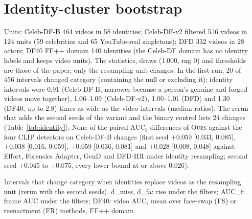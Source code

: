 \documentclass[10pt]{article}
\newcommand{\ours}{\textsc{Ours}}
\begin{document}
\section{Identity-cluster bootstrap}
\label{sec:identity}
Units: Celeb-DF-B 464 videos in 58 identities; Celeb-DF-v2 filtered 516 videos in 124 units (59 celebrities and 65 YouTube-real
singletons); DFD 332 videos in 28 actors; DF40 FF++ domain 140 identities (the Celeb-DF domain has no identity labels and keeps
video units). The statistics, draws (1,000, rng 0) and thresholds are those of the paper; only the resampling unit changes. In the
first run, 20 of 456 intervals changed category (containing the null or excluding it); identity intervals were 0.91 (Celeb-DF-B,
narrower because a person's genuine and forged videos move together), 1.06--1.09 (Celeb-DF-v2), 1.00--1.01 (DFD) and 1.30 (DF40,
up to 2.8) times as wide as the video intervals (median ratios). The rerun that adds the second seeds of the variant and the binary
control lists 24 changes (Table~\ref{tab:identity}). None of the paired AUC$_b$ differences of \ours{} against the four CLIP
detectors on Celeb-DF-B changes (first seed $+0.059$ [0.033, 0.085], $+0.038$ [0.016, 0.059], $+0.059$ [0.036, 0.081] and
$+0.028$ [0.008, 0.048] against Effort, Forensics Adapter, GenD and DFD-HR under identity resampling; second seed $+0.045$ to
$+0.075$, every lower bound at or above 0.026).
\begin{table}[H]
\centering
\caption{Intervals that change category when identities replace videos as the resampling unit (rerun with the second seeds).
d\_miss, d\_fa: rise under the filters; AUC\_f: frame AUC under the filters; DF40: video AUC, mean over face-swap (FS) or reenactment
(FR) methods, FF++ domain.}
\label{tab:identity}
\scriptsize
\begin{adjustbox}{max width=\linewidth}\end{adjustbox}
\end{table}
\end{document}
